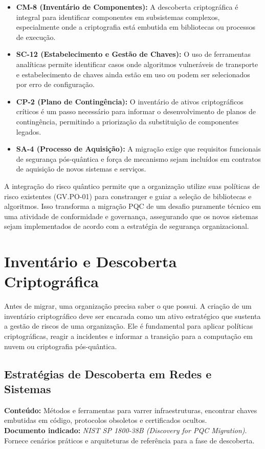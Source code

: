         \begin{itemize}
            \item \textbf{CM-8 (Inventário de Componentes):} A descoberta criptográfica é integral para identificar componentes em subsistemas complexos, especialmente onde a criptografia está embutida em bibliotecas ou processos de execução.
            \item \textbf{SC-12 (Estabelecimento e Gestão de Chaves):} O uso de ferramentas analíticas permite identificar casos onde algoritmos vulneráveis de transporte e estabelecimento de chaves ainda estão em uso ou podem ser selecionados por erro de configuração.
            \item \textbf{CP-2 (Plano de Contingência):} O inventário de ativos criptográficos críticos é um passo necessário para informar o desenvolvimento de planos de contingência, permitindo a priorização da substituição de componentes legados.
            \item \textbf{SA-4 (Processo de Aquisição):} A migração exige que requisitos funcionais de segurança pós-quântica e força de mecanismo sejam incluídos em contratos de aquisição de novos sistemas e serviços.
        \end{itemize}\cite{nistCSWP48}

        A integração do risco quântico permite que a organização utilize suas políticas de risco existentes (GV.PO-01) para constranger e guiar a seleção de bibliotecas e algoritmos.\cite{nistCSWP48} Isso transforma a migração PQC de um desafio puramente técnico em uma atividade de conformidade e governança, assegurando que os novos sistemas sejam implementados de acordo com a estratégia de segurança organizacional.

\section{Inventário e Descoberta Criptográfica}
    Antes de migrar, uma organização precisa saber o que possui. A criação de um inventário criptográfico deve ser encarada como um ativo estratégico que sustenta a gestão de riscos de uma organização. Ele é fundamental para aplicar políticas criptográficas, reagir a incidentes e informar a transição para a computação em nuvem ou criptografia pós-quântica.\cite{nistSP180038B}

    \subsection{Estratégias de Descoberta em Redes e Sistemas}
        \textbf{Conteúdo:} Métodos e ferramentas para varrer infraestruturas, encontrar chaves embutidas em código, protocolos obsoletos e certificados ocultos.\\
        \textbf{Documento indicado:} \textit{NIST SP 1800-38B (Discovery for PQC Migration)}. Fornece cenários práticos e arquiteturas de referência para a fase de descoberta.
    
